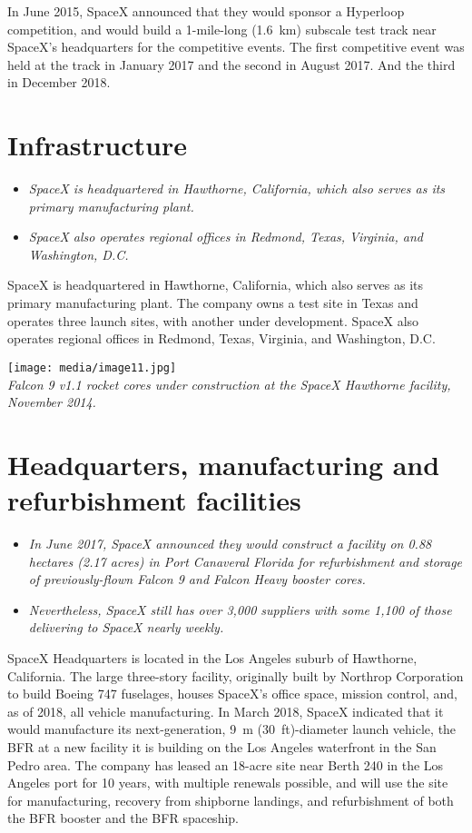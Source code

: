 In June 2015, SpaceX announced that they would sponsor a Hyperloop
competition, and would build a 1-mile-long (1.6~km) subscale test track
near SpaceX's headquarters for the competitive events. The first
competitive event was held at the track in January 2017 and the second
in August 2017. And the third in December 2018.

\section{Infrastructure}\label{infrastructure}

\begin{itemize}
\item
  \emph{SpaceX is headquartered in Hawthorne, California, which also
  serves as its primary manufacturing plant.}
\item
  \emph{SpaceX also operates regional offices in Redmond, Texas,
  Virginia, and Washington, D.C.}
\end{itemize}

SpaceX is headquartered in Hawthorne, California, which also serves as
its primary manufacturing plant. The company owns a test site in Texas
and operates three launch sites, with another under development. SpaceX
also operates regional offices in Redmond, Texas, Virginia, and
Washington, D.C.

\texttt{[image: media/image11.jpg]}\\
\emph{Falcon 9 v1.1 rocket cores under construction at the SpaceX
Hawthorne facility, November 2014.}

\section{Headquarters, manufacturing and refurbishment
facilities}\label{headquarters-manufacturing-and-refurbishment-facilities}

\begin{itemize}
\item
  \emph{In June 2017, SpaceX announced they would construct a facility
  on 0.88 hectares (2.17 acres) in Port Canaveral Florida for
  refurbishment and storage of previously-flown Falcon 9 and Falcon
  Heavy booster cores.}
\item
  \emph{Nevertheless, SpaceX still has over 3,000 suppliers with some
  1,100 of those delivering to SpaceX nearly weekly.}
\end{itemize}

SpaceX Headquarters is located in the Los Angeles suburb of Hawthorne,
California. The large three-story facility, originally built by Northrop
Corporation to build Boeing 747 fuselages, houses SpaceX's office space,
mission control, and, as of 2018, all vehicle manufacturing. In March
2018, SpaceX indicated that it would manufacture its next-generation,
9~m (30~ft)-diameter launch vehicle, the BFR at a new facility it is
building on the Los Angeles waterfront in the San Pedro area. The
company has leased an 18-acre site near Berth 240 in the Los Angeles
port for 10 years, with multiple renewals possible, and will use the
site for manufacturing, recovery from shipborne landings, and
refurbishment of both the BFR booster and the BFR spaceship.


